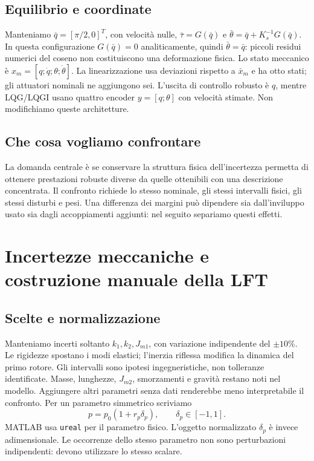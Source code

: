 \section{Equilibrio e coordinate}
Manteniamo $\bar q=[\pi/2,0]^T$, con velocità nulle,
$\bar\tau=G(\bar q)$ e $\bar\theta=\bar q+K_s^{-1}G(\bar q)$.
In questa configurazione $G(\bar q)=0$ analiticamente, quindi
$\bar\theta=\bar q$: piccoli residui numerici del coseno non costituiscono
una deformazione fisica. Lo stato meccanico è
$x_m=[q;\dot q;\theta;\dot\theta]$. La linearizzazione usa deviazioni
rispetto a $\bar x_m$ e ha otto stati; gli attuatori nominali ne aggiungono sei.
L'uscita di controllo robusto è $q$, mentre LQG/LQGI usano quattro encoder
$y=[q;\theta]$ con velocità stimate. Non modifichiamo queste architetture.
\section{Che cosa vogliamo confrontare}
La domanda centrale è se conservare la struttura fisica dell'incertezza
permetta di ottenere prestazioni robuste diverse da quelle ottenibili con
una descrizione concentrata. Il confronto richiede lo stesso nominale, gli
stessi intervalli fisici, gli stessi disturbi e pesi. Una differenza dei
margini può dipendere sia dall'inviluppo usato sia dagli accoppiamenti
aggiunti: nel seguito separiamo questi effetti.

\chapter{Incertezze meccaniche e costruzione manuale della LFT}
\section{Scelte e normalizzazione}
Manteniamo incerti soltanto $k_1,k_2,J_{m1}$, con variazione indipendente
del $\pm10\%$. Le rigidezze spostano i modi elastici; l'inerzia riflessa
modifica la dinamica del primo rotore. Gli intervalli sono ipotesi
ingegneristiche, non tolleranze identificate. Masse, lunghezze, $J_{m2}$,
smorzamenti e gravità restano noti nel modello. Aggiungere altri parametri
senza dati renderebbe meno interpretabile il confronto.
Per un parametro simmetrico scriviamo
\[
p=p_0(1+r_p\delta_p),\qquad \delta_p\in[-1,1].
\]
MATLAB usa \texttt{ureal} per il parametro fisico. L'oggetto normalizzato
$\delta_p$ è invece adimensionale. Le occorrenze dello stesso parametro
non sono perturbazioni indipendenti: devono utilizzare lo stesso scalare.
